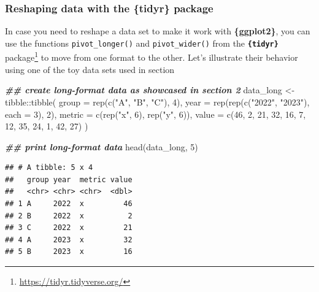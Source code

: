 \documentclass[
]{krantz}
\makeatletter
\newenvironment{Shaded}{\begin{snugshade}}{\end{snugshade}}
\newcommand{\AttributeTok}[1]{\textcolor[rgb]{0.61,0.61,0.61}{#1}}
\newcommand{\DecValTok}[1]{\textcolor[rgb]{0.06,0.06,0.06}{#1}}
\newcommand{\DocumentationTok}[1]{\textcolor[rgb]{0.37,0.37,0.37}{\textbf{\textit{#1}}}}
\newcommand{\FunctionTok}[1]{\textcolor[rgb]{0,0,0}{#1}}
\newcommand{\NormalTok}[1]{#1}
\newcommand{\OtherTok}[1]{\textcolor[rgb]{0.37,0.37,0.37}{#1}}
\newcommand{\SpecialCharTok}[1]{\textcolor[rgb]{0,0,0}{#1}}
\newcommand{\StringTok}[1]{\textcolor[rgb]{0.5,0.5,0.5}{#1}}
\renewcommand{\href}[2]{#2\footnote{\url{#1}}}
\newenvironment{kframe}{%
\medskip{}
\setlength{\fboxsep}{.8em}
 \def\at@end@of@kframe{}%
 \ifinner\ifhmode%
  \def\at@end@of@kframe{\end{minipage}}%
  \begin{minipage}{\columnwidth}%
 \fi\fi%
 \def\FrameCommand##1{\hskip\@totalleftmargin \hskip-\fboxsep
 \colorbox{shadecolor}{##1}\hskip-\fboxsep
     \hskip-\linewidth \hskip-\@totalleftmargin \hskip\columnwidth}%
 \MakeFramed {\advance\hsize-\width
   \@totalleftmargin\z@ \linewidth\hsize
   \@setminipage}}%
 {\par\unskip\endMakeFramed%
 \at@end@of@kframe}
\renewenvironment{Shaded}{\begin{kframe}}{\end{kframe}}
\makeatother
\begin{document}
\hypertarget{tidyr}{%
\subsubsection{Reshaping data with the \{tidyr\} package}\label{tidyr}}

In case you need to reshape a data set to make it work with \textbf{\{ggplot2\}}, you can use the functions \texttt{pivot\_longer()} and \texttt{pivot\_wider()} from the \href{https://tidyr.tidyverse.org/}{\textbf{\texttt{\{tidyr\}}} package} \citep{tidyr} to move from one format to the other. Let's illustrate their behavior using one of the toy data sets used in section

\begin{Shaded}
\begin{Highlighting}[]
\DocumentationTok{\#\# create long{-}format data as showcased in section 2}
\NormalTok{data\_long }\OtherTok{\textless{}{-}}\NormalTok{ tibble}\SpecialCharTok{::}\FunctionTok{tibble}\NormalTok{(}
  \AttributeTok{group =} \FunctionTok{rep}\NormalTok{(}\FunctionTok{c}\NormalTok{(}\StringTok{"A"}\NormalTok{, }\StringTok{"B"}\NormalTok{, }\StringTok{"C"}\NormalTok{), }\DecValTok{4}\NormalTok{),}
  \AttributeTok{year =} \FunctionTok{rep}\NormalTok{(}\FunctionTok{rep}\NormalTok{(}\FunctionTok{c}\NormalTok{(}\StringTok{"2022"}\NormalTok{, }\StringTok{"2023"}\NormalTok{), }\AttributeTok{each =} \DecValTok{3}\NormalTok{), }\DecValTok{2}\NormalTok{),}
  \AttributeTok{metric =} \FunctionTok{c}\NormalTok{(}\FunctionTok{rep}\NormalTok{(}\StringTok{"x"}\NormalTok{, }\DecValTok{6}\NormalTok{), }\FunctionTok{rep}\NormalTok{(}\StringTok{"y"}\NormalTok{, }\DecValTok{6}\NormalTok{)),}
  \AttributeTok{value =} \FunctionTok{c}\NormalTok{(}\DecValTok{46}\NormalTok{, }\DecValTok{2}\NormalTok{, }\DecValTok{21}\NormalTok{, }\DecValTok{32}\NormalTok{, }\DecValTok{16}\NormalTok{, }\DecValTok{7}\NormalTok{, }\DecValTok{12}\NormalTok{, }\DecValTok{35}\NormalTok{, }\DecValTok{24}\NormalTok{, }\DecValTok{1}\NormalTok{, }\DecValTok{42}\NormalTok{, }\DecValTok{27}\NormalTok{)}
\NormalTok{)}

\DocumentationTok{\#\# print long{-}format data}
\FunctionTok{head}\NormalTok{(data\_long, }\DecValTok{5}\NormalTok{)}
\end{Highlighting}
\end{Shaded}

\begin{verbatim}
## # A tibble: 5 x 4
##   group year  metric value
##   <chr> <chr> <chr>  <dbl>
## 1 A     2022  x         46
## 2 B     2022  x          2
## 3 C     2022  x         21
## 4 A     2023  x         32
## 5 B     2023  x         16
\end{verbatim}
\end{document}
